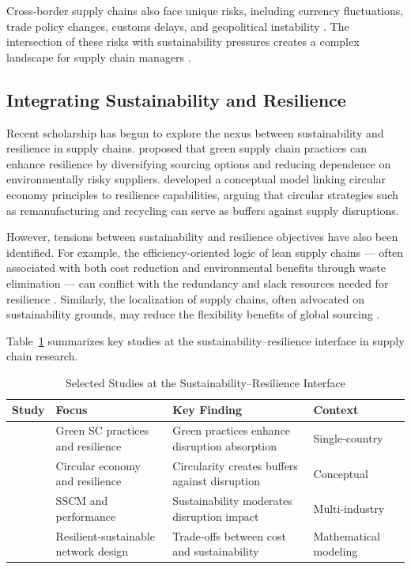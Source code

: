 \documentclass[12pt,a4paper,twoside]{article}
\begin{document}
Cross-border supply chains also face unique risks, including currency
fluctuations, trade policy changes, customs delays, and geopolitical instability
\citep{manuj2008global, christopher2011approaches}.  The intersection of these
risks with sustainability pressures creates a complex landscape for supply chain
managers \citep{giannakis2016supply}.

\subsection{Integrating Sustainability and Resilience}

Recent scholarship has begun to explore the nexus between sustainability and
resilience in supply chains.  \citet{fahimnia2015quantitative} proposed that
green supply chain practices can enhance resilience by diversifying sourcing
options and reducing dependence on environmentally risky suppliers.
\citet{negri2021integrating} developed a conceptual model linking circular
economy principles to resilience capabilities, arguing that circular strategies
such as remanufacturing and recycling can serve as buffers against supply
disruptions.

However, tensions between sustainability and resilience objectives have also
been identified.  For example, the efficiency-oriented logic of lean supply
chains --- often associated with both cost reduction and environmental benefits
through waste elimination --- can conflict with the redundancy and slack
resources needed for resilience \citep{ivanov2017lean}.  Similarly, the
localization of supply chains, often advocated on sustainability grounds, may
reduce the flexibility benefits of global sourcing \citep{wieland2021two}.

Table~\ref{tab:literature} summarizes key studies at the
sustainability--resilience interface in supply chain research.

\begin{table}[htbp]
\centering
\caption{Selected Studies at the Sustainability--Resilience Interface}
\label{tab:literature}
\begin{tabular}{@{}p{3cm}p{4cm}p{3cm}p{3cm}@{}}
\toprule
\textbf{Study} & \textbf{Focus} & \textbf{Key Finding} & \textbf{Context} \\
\midrule
\citet{fahimnia2015quantitative} & Green SC practices and resilience & Green practices enhance disruption absorption & Single-country \\
\citet{negri2021integrating} & Circular economy and resilience & Circularity creates buffers against disruption & Conceptual \\
\citet{govindan2020supply} & SSCM and performance & Sustainability moderates disruption impact & Multi-industry \\
\citet{sabouhi2021resilient} & Resilient-sustainable network design & Trade-offs between cost and sustainability & Mathematical modeling \\
\bottomrule
\end{tabular}
\end{table}
\end{document}
